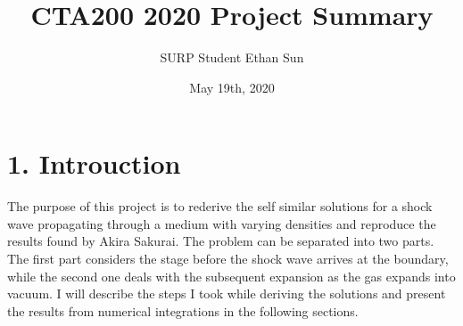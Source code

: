 \documentclass{article}
\title{CTA200 2020 Project Summary}
\author{SURP Student Ethan Sun}
\date{May 19th, 2020}
\begin{document}
\maketitle
\section*{1. Introuction}
The purpose of this project is to rederive the self similar solutions for a shock wave propagating through a medium with varying densities and reproduce the results found by Akira Sakurai. The problem can be separated into two parts. The first part considers the stage before the shock wave arrives at the boundary, while the second one deals with the subsequent expansion as the gas expands into vacuum. I will describe the steps I took while deriving the solutions and present the results from numerical integrations in the following sections.
\end{document}
